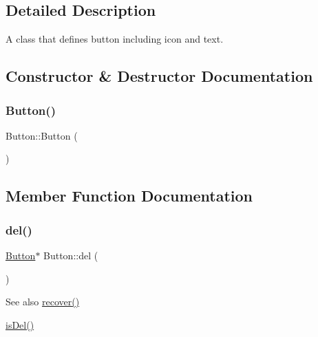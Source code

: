 \subsection{Detailed Description}
A class that defines button including icon and text. 

\subsection{Constructor \& Destructor Documentation}
\mbox{\label{class_button_a3b36df1ae23c58aedb9e15a713159459}} 
\subsubsection{\texorpdfstring{Button()}{Button()}}
{\footnotesize\ttfamily Button\+::\+Button (\begin{DoxyParamCaption}{ }\end{DoxyParamCaption})\hspace{0.3cm}{\ttfamily [inline]}}



\subsection{Member Function Documentation}
\mbox{\label{class_button_a83d4a76946aa8896173c010e5846f74c}} 
\subsubsection{\texorpdfstring{del()}{del()}}
{\footnotesize\ttfamily \mbox{\hyperlink{class_button}{Button}}$\ast$ Button\+::del (\begin{DoxyParamCaption}{ }\end{DoxyParamCaption})\hspace{0.3cm}{\ttfamily [inline]}}

\begin{DoxySeeAlso}{See also}
\mbox{\hyperlink{class_button_a769460b65574008ad93b2a7a9bbc0673}{recover()}} 

\mbox{\hyperlink{class_button_a8926913ae57165ae3ee4b1496509895e}{is\+Del()}} 
\end{DoxySeeAlso}
\mbox{\label{class_button_a51d629e519d30f27ee113efc1a819cab}} 
